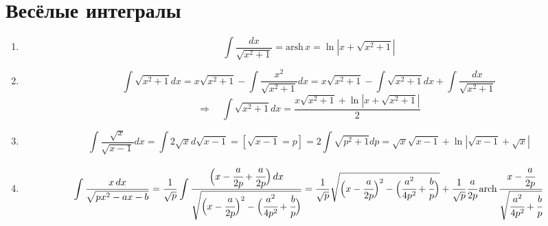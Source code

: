 \section{Весёлые интегралы}

\begin{enumerate}
	\item 
	\[
		\int \frac{dx}{\sqrt{x^2 + 1}} = \mathrm{arsh\,}x = \ln |x + \sqrt{x^2 + 1}|
	\]
	\item
	\[
		\int \sqrt{x^2 + 1} dx = 
		x \sqrt{x^2 + 1} - \int \frac{x^2}{\sqrt{x^2 + 1}}dx =
		x \sqrt{x^2 + 1} - \int \sqrt{x^2 + 1}dx + \int \frac{dx}{\sqrt{x^2 + 1}}
	\]
	\[
		\Rightarrow \quad
		\int \sqrt{x^2 + 1} dx = \frac{x \sqrt{x^2 + 1} + \ln |x + \sqrt{x^2 + 1}|}{2}
	\]
	\item
	\[
		\int \frac{\sqrt{x}}{\sqrt{x-1}} dx = 
		\int 2 \sqrt{x} d\sqrt{x-1} =
		[\sqrt{x - 1} = p]
		= 2 \int \sqrt{p^2 + 1} dp = 
		\sqrt{x} \sqrt{x-1}+ \ln |\sqrt{x - 1} + \sqrt{x}|
	\]
	\item
	\[
		\int \frac{x\,dx}{\sqrt{px^2 - ax - b}} = 
		\frac{1}{\sqrt{p}} \int \frac{\Big(x - \cfrac{a}{2p} + \cfrac{a}{2p}\Big)\,dx}{\sqrt{\Big(x - \cfrac{a}{2p}\Big)^2 - \Big(\cfrac{a^2}{4p^2} + \cfrac{b}{p}\Big)}}
		= \frac{1}{\sqrt{p}} \sqrt{\Big(x - \cfrac{a}{2p}\Big)^2 - \Big(\cfrac{a^2}{4p^2} + \cfrac{b}{p}\Big)} + 
		\frac{1}{\sqrt{p}} \cfrac{a}{2p} \,\mathrm{arch\,} \frac{x - \cfrac{a}{2p}}{\sqrt{\cfrac{a^2}{4p^2} + \cfrac{b}{p}}}
	\]
\end{enumerate}